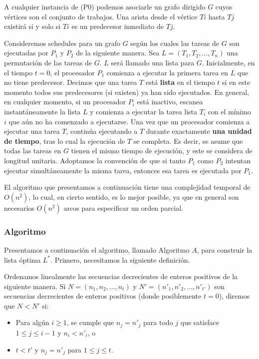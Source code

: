 \documentclass[14pt]{extarticle}
\begin{document}
A cualquier instancia de (P0) podemos asociarle un grafo dirigido $G$ cuyos vértices son el conjunto de trabajos. Una arista desde el vértice $Ti$ hasta $Tj$ existirá si y solo si $Ti$ es un predecesor inmediato de $Tj$.

Consideremos schedules para un grafo $G$ según los cuales las tareas de $G$ son ejecutadas por $P_1$ y $P_2$ de la siguiente manera. Sea $L = (T_1, T_2, \dots, T_n)$ una permutación de las tareas de $G$. $L$ será llamado una lista para $G$. Inicialmente, en el tiempo $t = 0$, el procesador $P_1$ comienza a ejecutar la primera tarea en $L$ que no tiene predecesor. Decimos que una tarea $T$ está \textbf{lista} en el tiempo $t$ si en este momento todos sus predecesores (si existen) ya han sido ejecutados. En general, en cualquier momento, si un procesador $P_i$ está inactivo, escanea instantáneamente la lista $L$ y comienza a ejecutar la tarea lista $T_i$ con el mínimo $i$ que aún no ha comenzado a ejecutarse. Una vez que un procesador comienza a ejecutar una tarea $T$, continúa ejecutando a $T$ durante exactamente \textbf{una unidad de tiempo}, tras lo cual la ejecución de $T$ se completa. Es decir, se asume que todas las tareas en $G$ tienen el mismo tiempo de ejecución, y este se considera de longitud unitaria. Adoptamos la convención de que si tanto $P_1$ como $P_2$ intentan ejecutar simultáneamente la misma tarea, entonces esa tarea es ejecutada por $P_1$.

El algoritmo que presentamos a continuación tiene una complejidad temporal de $O(n^2)$, lo cual, en cierto sentido, es lo mejor posible, ya que en general son necesarios $O(n^2)$ arcos para especificar un orden parcial.

\subsubsection*{Algoritmo}

Presentamos a continuación el algoritmo, llamado Algoritmo $A$, para construir la lista óptima $L^*$. Primero, necesitamos la siguiente definición.

Ordenamos linealmente las secuencias decrecientes de enteros positivos de la siguiente manera. Si $N = (n_1, n_2, \ldots, n_t)$ y $N' = (n'_1, n'_2, \ldots, n'_{t'})$ son secuencias decrecientes de enteros positivos (donde posiblemente $t = 0$), diremos que $N < N'$ si:

\begin{itemize}
    \item Para algún $i \geq 1$, se cumple que $n_j = n'_j$ para todo $j$ que satisface $1 \leq j \leq i - 1$ y $n_i < n'_i$, o
    \item $t < t'$ y $n_j = n'_j$ para $1 \leq j \leq t$.
\end{itemize}
\end{document}
